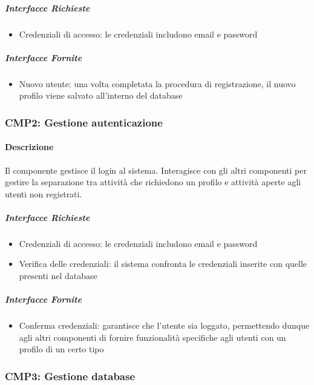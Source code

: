 \documentclass[9pt]{extarticle}
\begin{document}
\subparagraph{Interfacce Richieste}
\begin{itemize}
	\item Credenziali di accesso: le credenziali includono email e password
\end{itemize}

\subparagraph{Interfacce Fornite}
\begin{itemize}
	\item Nuovo utente: una volta completata la procedura di registrazione, il nuovo profilo viene salvato all'interno del database
\end{itemize}


\subsubsection*{CMP2: Gestione autenticazione}
\paragraph{Descrizione}
Il componente gestisce il login al sistema. Interagisce con gli altri componenti per gestire la separazione tra attività che richiedono un profilo e attività aperte agli utenti non registrati.
\subparagraph{Interfacce Richieste}
\begin{itemize}
	\item Credenziali di accesso: le credenziali includono email e password
	\item Verifica delle credenziali: il sistema confronta le credenziali inserite con quelle presenti nel database
\end{itemize}

\subparagraph{Interfacce Fornite}
\begin{itemize}
	\item Conferma credenziali: garantisce che l'utente sia loggato, permettendo dunque agli altri componenti di fornire funzionalità specifiche agli utenti con un profilo di un certo tipo
\end{itemize}

\subsubsection*{CMP3: Gestione database}
\end{document}
